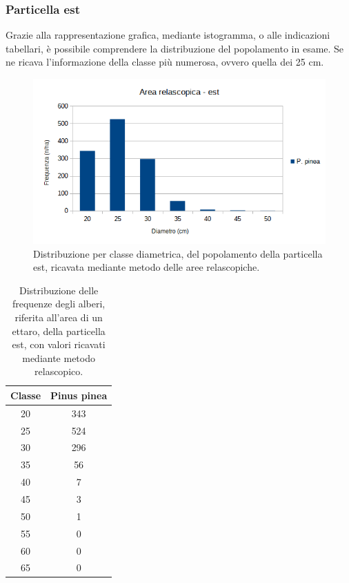\subsubsection*{Particella est}
Grazie alla rappresentazione grafica, mediante istogramma, o alle indicazioni tabellari, è possibile comprendere la distribuzione del popolamento in esame. Se ne ricava l'informazione della classe più numerosa, ovvero quella dei 25 cm.
\begin{figure}[H]
    \centering
    \includegraphics[width=0.7 \textwidth]{immagini/aree-relascopiche-est.png}
    \caption{Distribuzione per classe diametrica, del popolamento della particella est, ricavata mediante metodo delle aree relascopiche.}
    \label{fig:aree-relascopiche-est}
\end{figure}

\begin{table}[H]
\caption{Distribuzione delle frequenze degli alberi, riferita all'area di un ettaro, della particella est, con valori ricavati mediante metodo relascopico.}
\centering
\begin{tabular}{cc}
\toprule
Classe & Pinus pinea \\
\midrule
20     & 343      \\
25     & 524      \\
30     & 296      \\
35     & 56       \\
40     & 7        \\
45     & 3        \\
50     & 1        \\
55     & 0        \\
60     & 0        \\
65     & 0     \\
\bottomrule
\end{tabular}
\label{tab:tab_freq_relascopia_est}
\end{table}

